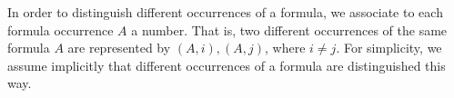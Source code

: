 \documentclass{new_tlp}
\begin{document}
% 
%

In order to distinguish different occurrences of a formula, we 
associate to each formula occurrence $A$ a number. 
That is, two different occurrences of the same formula $A$ are represented by $(A, i), (A, j)$, 
where $i \neq j$.
For simplicity, we assume implicitly that different occurrences of 
a formula are distinguished this way.
\end{document}
